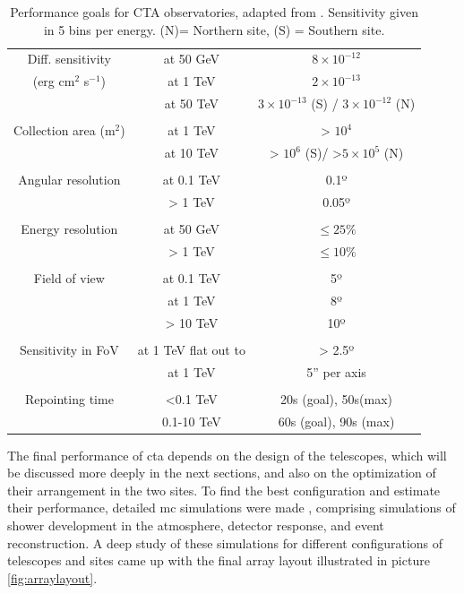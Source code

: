 \documentclass[main.tex]{subfiles}
\begin{document}
\begin{table}[h]
  \centering
  \begin{tabular}{ccc}
    \hline
    Diff. sensitivity & at 50 GeV & $8\times10^{-12}$\\
    (erg cm$^2$ s$^{-1}$) & at 1 TeV & $2\times10^{-13}$\\
    & at 50 TeV & $3\times10^{-13}$ (S) / $3\times10^{-12}$ (N)\\\\
    Collection area (m$^{2}$) & at 1 TeV & > $10^4$ \\
    & at 10 TeV & > $10^6$ (S)/ >$5\times10^5$ (N) \\\\
    Angular resolution & at 0.1 TeV & 0.1º \\
    & > 1 TeV & 0.05º \\\\
    Energy resolution & at 50 GeV & $\le 25\%$ \\
    & > 1 TeV & $\le 10\%$ \\\\
    Field of view & at 0.1 TeV & 5º\\
    & at 1 TeV & 8º\\
    & > 10 TeV & 10º\\\\
    Sensitivity in FoV & at 1 TeV flat out to & > 2.5º \\
    & at 1 TeV & 5'' per axis \\\\
    Repointing time & <0.1 TeV  & 20s (goal), 50s(max) \\
    & 0.1-10 TeV & 60s (goal), 90s (max) \\
    \hline
  \end{tabular}
  \caption{Performance goals for CTA observatories, adapted from \cite{CTAconcept}. Sensitivity given in 5 bins per energy. (N)= Northern site, (S) = Southern site.}
  \label{tab:CTAgoals}
\end{table}

The final performance of \gls{cta} depends on the design of the telescopes, which will be discussed more deeply in the next sections, and also on the optimization of their arrangement in the two sites.
To find the best configuration and estimate their performance,  detailed \gls{mc} simulations were made \cite{2013CTAMonteCarlo}, comprising simulations of shower development in the atmosphere, detector response, and event reconstruction.
A deep study of these simulations \cite{2017CTAMCPerformance} for different configurations of telescopes and sites came up with the final array layout illustrated in picture \ref{fig:arraylayout}.
\end{document}
